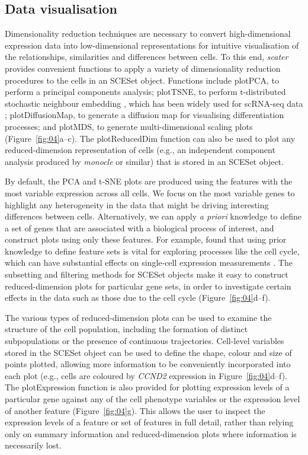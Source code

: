 \documentclass{bioinfo}
\begin{document}
\subsection{Data visualisation}\label{data-visualisation}

Dimensionality reduction techniques are necessary to convert
high-dimensional expression data into low-dimensional representations
for intuitive visualisation of the relationships, similarities and
differences between cells. To this end, \emph{scater} provides
convenient functions to apply a variety of dimensionality reduction
procedures to the cells in an SCESet object. Functions include plotPCA,
to perform a principal components analysis; plotTSNE, to perform
t-distributed stochastic neighbour embedding \citep{Van_der_Maaten2008-oe}, which has
been widely used for scRNA-seq data \citep{Amir2013-nf,Bendall2014-gf,Macosko2015-vt};
plotDiffusionMap, to generate a diffusion map \citep{Haghverdi2015-fm} for
visualising differentiation processes; and plotMDS, to generate
multi-dimensional scaling plots (Figure~\ref{fig:04}a--c). The plotReducedDim
function can also be used to plot any reduced-dimension representation of cells
(e.g., an independent component analysis produced by \emph{monocle}
\citep{Trapnell2013-fv} or similar) that is stored in an SCESet object.

By default, the PCA and t-SNE plots are produced using the features with
the most variable expression across all cells. We focus on the most variable genes to highlight any
heterogeneity in the data that might be driving interesting differences between
cells. Alternatively, we can apply \emph{a priori} knowledge to define a set of
genes that are associated with a biological process of interest, and construct
plots using only these features. For example, \citealp{Scialdone2015-gj}
found that using prior knowledge to define feature sets is vital for
exploring processes like the cell cycle, which can have substantial effects on
single-cell expression measurements \citep{Buettner2015-jg}. The subsetting
and filtering methods for SCESet objects make it easy to construct
reduced-dimension plots for particular gene sets, in order to
investigate certain effects in the data such as those due to the cell
cycle (Figure~\ref{fig:04}d--f).

The various types of reduced-dimension plots can be used to examine the structure of the cell population, including the formation of distinct subpopulations or the presence of continuous trajectories. Cell-level variables stored in the
SCESet object can be used to define the shape, colour and size of points
plotted, allowing more information to be conveniently incorporated into
each plot (e.g., cells are coloured by \emph{CCND2} expression in
Figure~\ref{fig:04}d--f). The plotExpression function is also provided for
plotting expression levels of a particular gene against any of the cell
phenotype variables or the expression level of
another feature (Figure~\ref{fig:04}g). This allows the user to inspect the expression levels
of a feature or set of features in full detail, rather than relying only
on summary information and reduced-dimension plots where information is
necessarily lost.
\end{document}
